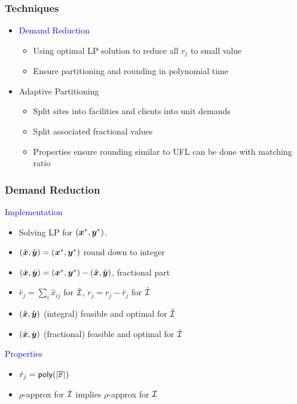 \documentclass[handout, hyperref, dvipsnames]{beamer}
\begin{document}
\begin{frame}

  \frametitle{Techniques}
  \begin{itemize}\addtolength{\itemsep}{2\baselineskip}

  \item {\Large \textcolor{blue}{Demand Reduction}}
    \vspace{.1in}
    \begin{itemize}\addtolength{\itemsep}{1\baselineskip}
    \item \alert{\large Using optimal LP solution to reduce all $r_j$ to small value}
    \item \alert{\large Ensure partitioning and rounding in polynomial time}
    \end{itemize}
    
  \item {\Large {Adaptive Partitioning}}
    \vspace{.1in}
    \begin{itemize}\addtolength{\itemsep}{1\baselineskip}
    \item {\large Split sites into facilities and clients into unit demands}
    \item {\large Split associated fractional values}
    \item {\large Properties ensure rounding similar to UFL can be done with matching ratio}
    \end{itemize}
  \end{itemize}
\end{frame}

\begin{frame}
  \frametitle{Demand Reduction}

  \large{\textcolor{blue}{Implementation}}

  \begin{itemize}
  \item Solving LP for $(\boldsymbol{x}^\ast, \boldsymbol{y}^\ast)$.
  \item $(\hat{\boldsymbol{x}}, \hat{\boldsymbol{y}}) = (\boldsymbol{x}^\ast, \boldsymbol{y}^\ast)$ round down to integer
  \item $(\dot{\boldsymbol{x}}, \dot{\boldsymbol{y}}) = (\boldsymbol{x}^\ast, \boldsymbol{y}^\ast) - (\hat{\boldsymbol{x}}, \hat{\boldsymbol{y}})$, fractional part
  \item $\hat r_j = \sum_{i}\hat x_{ij}$ for $\hat{\mathcal{I}}$, $\dot r_j = r_j - \hat r_j$ for $\dot{\mathcal{I}}$
  \item $(\hat{\boldsymbol{x}}, \hat{\boldsymbol{y}})$ (integral) feasible and optimal for $\hat{\mathcal{I}}$
  \item $(\dot{\boldsymbol{x}}, \dot{\boldsymbol{y}})$ (fractional) feasible and optimal for $\dot{\mathcal{I}}$
  \end{itemize}
  
  \large{\textcolor{blue}{Properties}}

  \begin{itemize}
  \item ${\dot r}_j = {\mbox{\sf poly}}(|\mathbb{F}|)$
  \item $\rho$-approx for $\dot {\mathcal{I}}$ implies $\rho$-approx for $\mathcal{I}$
  \end{itemize}
\end{frame}
\end{document}
